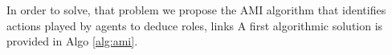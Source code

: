 \documentclass[runningheads]{llncs}
\begin{document}
In order to solve, that problem we propose the AMI algorithm that identifies actions played by agents to deduce roles, links 
A first algorithmic solution is provided in Algo \ref{alg:ami}.






\end{document}
